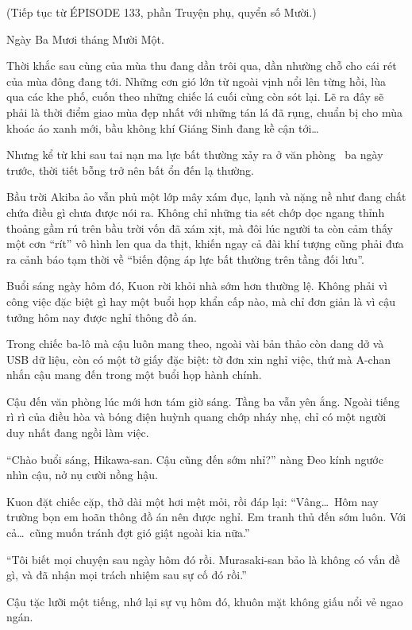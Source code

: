 \documentclass[../main.tex]{subfiles}
\begin{document}
\begin{center}
    (Tiếp tục từ {\flaregothic ÉPISODE 133}, phần {\abv Truyện phụ}, quyển số Mười.)
\end{center}

Ngày Ba Mươi tháng Mười Một.

Thời khắc sau cùng của mùa thu đang dần trôi qua, dần nhường chỗ cho cái rét của mùa đông đang tới. Những cơn gió lớn từ ngoài vịnh nổi lên từng hồi, lùa qua các khe phố, cuốn theo những chiếc lá cuối cùng còn sót lại. Lẽ ra đây sẽ phải là thời điểm giao mùa đẹp nhất với những tán lá đã rụng, chuẩn bị cho mùa khoác áo xanh mới, bầu không khí Giáng Sinh đang kề cận tới\dots

Nhưng kể từ khi sau tai nạn ma lực bất thường xảy ra ở văn phòng \hll\ ba ngày trước, thời tiết bỗng trở nên bất ổn đến lạ thường.

Bầu trời Akiba ảo vẫn phủ một lớp mây xám đục, lạnh và nặng nề như đang chất chứa điều gì chưa được nói ra. Không chỉ những tia sét chớp dọc ngang thỉnh thoảng gầm rú trên bầu trời vốn đã xám xịt, mà đôi lúc người ta còn cảm thấy một cơn ``rít'' vô hình len qua da thịt, khiến ngay cả đài khí tượng cũng phải đưa ra cảnh báo tạm thời về ``biến động áp lực bất thường trên tầng đối lưu''.

Buổi sáng ngày hôm đó, Kuon rời khỏi nhà sớm hơn thường lệ. Không phải vì công việc đặc biệt gì hay một buổi họp khẩn cấp nào, mà chỉ đơn giản là vì cậu tưởng hôm nay được nghỉ thông đồ án.

Trong chiếc ba-lô mà cậu luôn mang theo, ngoài vài bản thảo còn dang dở và USB dữ liệu, còn có một tờ giấy đặc biệt: tờ đơn xin nghỉ việc, thứ mà A-chan nhắn cậu mang đến trong một buổi họp hành chính.

Cậu đến văn phòng lúc mới hơn tám giờ sáng. Tầng ba vẫn yên ắng. Ngoài tiếng rì rì của điều hòa và bóng điện huỳnh quang chớp nháy nhẹ, chỉ có một người duy nhất đang ngồi làm việc.

``Chào buổi sáng, Hikawa-san. Cậu cũng đến sớm nhỉ?'' nàng Đeo kính ngước nhìn cậu, nở nụ cười nồng hậu.

Kuon đặt chiếc cặp, thở dài một hơi mệt mỏi, rồi đáp lại: ``Vâng\dots\ Hôm nay trường bọn em hoãn thông đồ án nên được nghỉ. Em tranh thủ đến sớm luôn. Với cả\dots\ cũng muốn tránh đợt gió giật ngoài kia nữa.''

``Tôi biết mọi chuyện sau ngày hôm đó rồi. Murasaki-san bảo là không có vấn đề gì, và đã nhận mọi trách nhiệm sau sự cố đó rồi.''

Cậu tặc lưỡi một tiếng, nhớ lại sự vụ hôm đó, khuôn mặt không giấu nổi vẻ ngao ngán.
\end{document}
